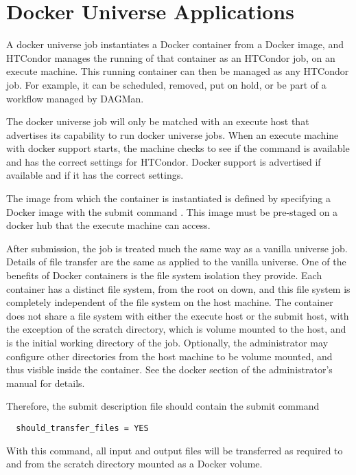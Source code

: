 \section{Docker Universe Applications}\label{sec:dockeruniverse}
A docker universe job instantiates a Docker container
from a Docker image, and HTCondor manages the running
of that container as an HTCondor job, on an execute machine.
This running container can then be managed as any HTCondor job.
For example, it can be scheduled, removed, put on hold, 
or be part of a workflow managed by DAGMan.

The docker universe job will only be matched with an execute host
that advertises its capability to run docker universe jobs.
When an execute machine with docker support starts, 
the machine checks to
see if the  command is available and has the correct
settings for HTCondor.  
Docker support is advertised if available and if it has the correct settings.

The image from which the container is instantiated is
defined by specifying a Docker image with the submit command
.  
This image must be pre-staged on a docker
hub that the execute machine can access.

After submission, the job is treated much the same way as a vanilla 
universe job.  
Details of file transfer are the same as applied to 
the vanilla universe.  
One of the benefits of Docker containers is 
the file system isolation they provide.  
Each container has a distinct file system, 
from the root on down, and this file
system is completely independent of the file system on the host machine.
The container does not share a file system with either the execute
host or the submit host, with the exception of the scratch directory,
which is volume mounted to the host, and is the initial working
directory of the job.  Optionally, the administrator may configure other
directories from the host machine to be volume mounted, and thus visible
inside the container.  See the docker section of the administrator's manual
for details.

Therefore,
the submit description file should contain the submit command
\begin{verbatim}
  should_transfer_files = YES
\end{verbatim}
With this command,  all input and output files will be transferred
as required to and from the scratch directory mounted as a
Docker volume.

